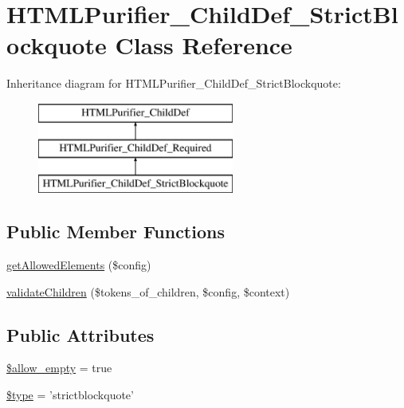 \hypertarget{classHTMLPurifier__ChildDef__StrictBlockquote}{\section{H\+T\+M\+L\+Purifier\+\_\+\+Child\+Def\+\_\+\+Strict\+Blockquote Class Reference}
\label{classHTMLPurifier__ChildDef__StrictBlockquote}
}
Inheritance diagram for H\+T\+M\+L\+Purifier\+\_\+\+Child\+Def\+\_\+\+Strict\+Blockquote\+:\begin{figure}[H]
\begin{center}
\leavevmode
\includegraphics[height=3.000000cm]{classHTMLPurifier__ChildDef__StrictBlockquote}
\end{center}
\end{figure}
\subsection*{Public Member Functions}
\begin{DoxyCompactItemize}
\item 
\hyperlink{classHTMLPurifier__ChildDef__StrictBlockquote_a1f2b4a7ae5ec3540f0ab37ee0817106a}{get\+Allowed\+Elements} (\$config)
\item 
\hyperlink{classHTMLPurifier__ChildDef__StrictBlockquote_af489a7893110f67a891020f8982de01a}{validate\+Children} (\$tokens\+\_\+of\+\_\+children, \$config, \$context)
\end{DoxyCompactItemize}
\subsection*{Public Attributes}
\begin{DoxyCompactItemize}
\item 
\hyperlink{classHTMLPurifier__ChildDef__StrictBlockquote_a83ad81362bae210bb7169fae156f0016}{\$allow\+\_\+empty} = true
\item 
\hyperlink{classHTMLPurifier__ChildDef__StrictBlockquote_ac98c7b6e19426f0366c651034edee22f}{\$type} = 'strictblockquote'
\end{DoxyCompactItemize}
